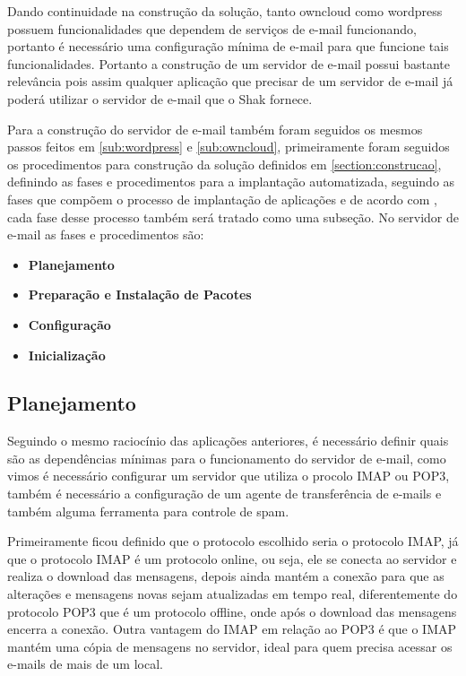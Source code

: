 Dando continuidade na construção da solução, tanto owncloud como wordpress
possuem funcionalidades que dependem de serviços de e-mail funcionando, portanto
é necessário uma configuração mínima de e-mail para que funcione tais funcionalidades.
Portanto a construção de um servidor de e-mail possui bastante relevância pois
assim qualquer aplicação que precisar de um servidor de e-mail já poderá utilizar
o servidor de e-mail que o Shak fornece.

Para a construção do servidor de e-mail também foram seguidos os mesmos passos
feitos em \ref{sub:wordpress} e \ref{sub:owncloud}, primeiramente foram seguidos os
procedimentos para construção da solução definidos em \ref{section:construcao},
definindo as fases e procedimentos para a implantação automatizada, seguindo as
fases que compõem o processo de implantação de aplicações e de acordo com \cite{omg2006},
cada fase desse processo também será tratado como uma subseção. No servidor de e-mail
as fases e procedimentos são:

 \begin{itemize}
   \item  \textbf{Planejamento}
   \item  \textbf{Preparação e Instalação de Pacotes}
   \item  \textbf{Configuração}
   \item  \textbf{Inicialização}
 \end{itemize}

\subsection{Planejamento}

Seguindo o mesmo raciocínio das aplicações anteriores, é necessário definir
quais são as dependências mínimas para o funcionamento do servidor de e-mail,
como vimos é necessário configurar um servidor que utiliza o procolo IMAP ou POP3,
também é necessário a configuração de um agente de transferência de e-mails e também
alguma ferramenta para controle de spam.

Primeiramente ficou definido que o protocolo escolhido seria o protocolo IMAP, já
que o protocolo IMAP é um protocolo online, ou seja, ele se conecta ao servidor
e realiza o download das mensagens, depois ainda  mantém a conexão para que
as alterações e mensagens novas sejam atualizadas em tempo real, diferentemente do
protocolo POP3 que é um protocolo offline, onde após o download das mensagens encerra
a conexão. Outra vantagem do IMAP em relação ao POP3 é que o IMAP mantém uma cópia
de mensagens no servidor, ideal para quem precisa acessar os e-mails de mais de um local.

